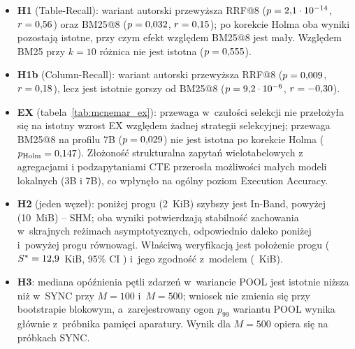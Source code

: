 \begin{table}[htbp]
\centering
\small
\caption[Testy statystyczne hipotez badawczych]{Testy statystyczne hipotez H1, H1b, H2 i~H3 (testy dwustronne; $r$ -- korelacja rangowo-biserialna, dodatnia na korzyść wariantu autorskiego, SHM lub POOL; dla Wilcoxona podano $N$ i~w~nawiasie $n_{\text{eff}}$, dla Manna--Whitneya liczności obu prób)}
\label{tab:wilcoxon_hypothesis_tests}
\end{table}

\begin{itemize}
    \item \textbf{H1} (Table-Recall): wariant autorski przewyższa RRF@8 ($p = 2{,}1 \cdot 10^{-14}$, $r = 0{,}56$) oraz BM25@8 ($p = 0{,}032$, $r = 0{,}15$); po korekcie Holma oba wyniki pozostają istotne, przy czym efekt względem BM25@8 jest mały. Względem BM25 przy $k = 10$ różnica nie jest istotna ($p = 0{,}555$).
    \item \textbf{H1b} (Column-Recall): wariant autorski przewyższa RRF@8 ($p = 0{,}009$, $r = 0{,}18$), lecz jest istotnie gorszy od BM25@8 ($p = 9{,}2 \cdot 10^{-6}$, $r = -0{,}30$).
    \item \textbf{EX} (tabela~\ref{tab:mcnemar_ex}): przewaga w~czułości selekcji nie przełożyła się na istotny wzrost EX względem żadnej strategii selekcyjnej; przewaga BM25@8 na profilu 7B ($p = 0{,}029$) nie jest istotna po korekcie Holma ($p_{\text{Holm}} = 0{,}147$). Złożoność strukturalna zapytań wielotabelowych z agregacjami i podzapytaniami CTE przerosła możliwości małych modeli lokalnych (3B i 7B), co wpłynęło na ogólny poziom Execution Accuracy.
    \item \textbf{H2} (jeden węzeł): poniżej progu (2~KiB) szybszy jest In-Band, powyżej (10~MiB) -- SHM; oba wyniki potwierdzają stabilność zachowania w~skrajnych reżimach asymptotycznych, odpowiednio daleko poniżej i~powyżej progu równowagi. Właściwą weryfikacją jest położenie progu ($S^* = 12{,}9$~KiB, 95\% CI \wynSstarCiLoopShm) i~jego zgodność z~modelem (\wynOsevenModel~KiB).
    \item \textbf{H3}: mediana opóźnienia pętli zdarzeń w~wariancie POOL jest istotnie niższa niż w~SYNC przy $M = 100$ i~$M = 500$; wniosek nie zmienia się przy bootstrapie blokowym, a~zarejestrowany ogon $p_{99}$ wariantu POOL wynika głównie z~próbnika pamięci aparatury. Wynik dla $M = 500$ opiera się na \wynCcSyncFivehundredLagN{} próbkach SYNC.
\end{itemize}


